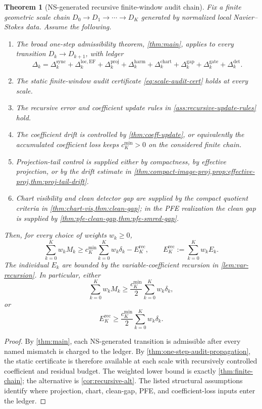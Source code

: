\documentclass[11pt]{article}
\numberwithin{equation}{section}
\theoremstyle{plain}
\newtheorem{theorem}{Theorem}[section]
\theoremstyle{definition}
\theoremstyle{remark}
\newcommand{\loc}{\mathrm{loc}}
\newcommand{\harm}{\mathrm{harm}}
\newcommand{\proj}{\mathrm{proj}}
\newcommand{\sync}{\mathrm{sync}}
\newcommand{\gate}{\mathrm{gate}}
\newcommand{\detc}{\mathrm{det}}
\newcommand{\chart}{\mathrm{chart}}
\newcommand{\gap}{\mathrm{gap}}
\newcommand{\EF}{\mathrm{EF}}
\begin{document}
\begin{theorem}[NS-generated recursive finite-window audit chain]\label{thm:final-fw-chain}
Fix a finite geometric scale chain \(D_0\to D_1\to\cdots\to D_K\) generated by normalized local Navier--Stokes data.  Assume the following.
\begin{enumerate}[label=(\alph*)]
  \item The broad one-step admissibility theorem, \cref{thm:main}, applies to every transition \(D_k\to D_{k+1}\), with ledger
  \[
    \Delta_k=\Delta_k^{\sync}+\Delta_k^{\loc,\EF}+\Delta_k^{\proj}+\Delta_k^{\harm}+\Delta_k^{\chart}+\Delta_k^{\gap}+\Delta_k^{\gate}+\Delta_k^{\detc}.
  \]
  \item The static finite-window audit certificate \eqref{eq:scale-audit-cert} holds at every scale.
  \item The recursive error and coefficient update rules in \cref{ass:recursive-update-rules} hold.
  \item The coefficient drift is controlled by \cref{thm:coeff-update}, or equivalently the accumulated coefficient loss keeps \(c_K^{\min}>0\) on the considered finite chain.
  \item Projection-tail control is supplied either by compactness, by effective projection, or by the drift estimate in \cref{thm:compact-image-proj,prop:effective-proj,thm:proj-tail-drift}.
  \item Chart visibility and clean detector gap are supplied by the compact quotient criteria in \cref{thm:chart-vis,thm:clean-gap}; in the PFE realization the clean gap is supplied by \cref{thm:pfe-clean-gap,thm:pfe-smred-gap}.
\end{enumerate}
Then, for every choice of weights \(w_k\ge0\),
\[
  \sum_{k=0}^K w_kM_k
  \ge
  c_K^{\min}\sum_{k=0}^K w_k\delta_k
  -E_K^{\mathrm{rec}},
  \qquad
  E_K^{\mathrm{rec}}:=\sum_{k=0}^K w_kE_k.
\]
The individual \(E_k\) are bounded by the variable-coefficient recursion in \cref{lem:var-recursion}.  In particular, either
\[
  \sum_{k=0}^K w_kM_k
  \ge
  \frac{c_K^{\min}}2\sum_{k=0}^K w_k\delta_k,
\]
or
\[
  E_K^{\mathrm{rec}}
  \ge
  \frac{c_K^{\min}}2\sum_{k=0}^K w_k\delta_k.
\]
\end{theorem}

\begin{proof}
By \cref{thm:main}, each NS-generated transition is admissible after every named mismatch is charged to the ledger.  By \cref{thm:one-step-audit-propagation}, the static certificate is therefore available at each scale with recursively controlled coefficient and residual budget.  The weighted lower bound is exactly \cref{thm:finite-chain}; the alternative is \cref{cor:recursive-alt}.  The listed structural assumptions identify where projection, chart, clean-gap, PFE, and coefficient-loss inputs enter the ledger.
\end{proof}
\end{document}
